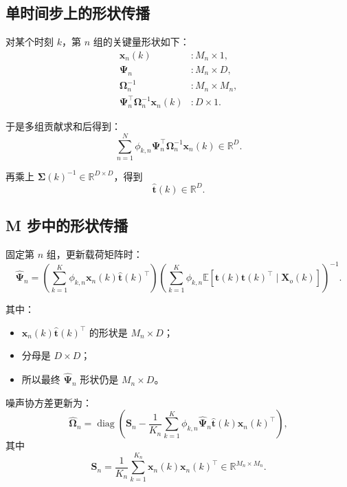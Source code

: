 \documentclass[UTF8]{ctexart}
\begin{document}
\subsection{单时间步上的形状传播}

对某个时刻 $k$，第 $n$ 组的关键量形状如下：
\begin{align}
    \bm{x}_n(k) &: M_n \times 1, \\
    \bm{\Psi}_n &: M_n \times D, \\
    \bm{\Omega}_n^{-1} &: M_n \times M_n, \\
    \bm{\Psi}_n^\top \bm{\Omega}_n^{-1} \bm{x}_n(k) &: D \times 1.
\end{align}

于是多组贡献求和后得到：
\begin{equation}
    \sum_{n=1}^{N}\phi_{k,n}\bm{\Psi}_n^\top \bm{\Omega}_n^{-1} \bm{x}_n(k)
    \in \mathbb{R}^{D}.
\end{equation}

再乘上 $\bm{\Sigma}(k)^{-1}\in\mathbb{R}^{D\times D}$，得到
\begin{equation}
    \hat{\bm{t}}(k)\in\mathbb{R}^{D}.
\end{equation}

\subsection{M 步中的形状传播}

固定第 $n$ 组，更新载荷矩阵时：
\begin{equation}
    \hat{\bm{\Psi}}_n
    =
    \left(
        \sum_{k=1}^{K}
        \phi_{k,n}\bm{x}_n(k)\hat{\bm{t}}(k)^\top
    \right)
    \left(
        \sum_{k=1}^{K}
        \phi_{k,n}
        \mathbb{E}\!\left[\bm{t}(k)\bm{t}(k)^\top \mid \bm{X}_o(k)\right]
    \right)^{-1}.
\end{equation}

其中：
\begin{itemize}
    \item $\bm{x}_n(k)\hat{\bm{t}}(k)^\top$ 的形状是 $M_n \times D$；
    \item 分母是 $D \times D$；
    \item 所以最终 $\hat{\bm{\Psi}}_n$ 形状仍是 $M_n \times D$。
\end{itemize}

噪声协方差更新为：
\begin{equation}
    \hat{\bm{\Omega}}_n
    =
    \operatorname{diag}
    \left(
        \bm{S}_n
        -
        \frac{1}{K_n}
        \sum_{k=1}^{K}
        \phi_{k,n}\hat{\bm{\Psi}}_n \hat{\bm{t}}(k)\bm{x}_n(k)^\top
    \right),
\end{equation}
其中
\begin{equation}
    \bm{S}_n = \frac{1}{K_n}\sum_{k=1}^{K_n}\bm{x}_n(k)\bm{x}_n(k)^\top \in \mathbb{R}^{M_n \times M_n}.
\end{equation}
\end{document}
